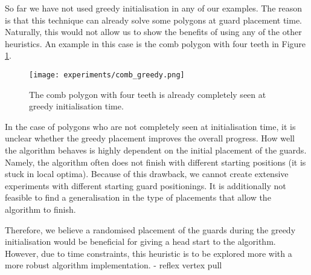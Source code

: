So far we have not used greedy initialisation in any of our examples. The reason is that this technique can already solve some polygons at guard placement time. Naturally, this would not allow us to show the benefits of using any of the other heuristics. An example in this case is the comb polygon with four teeth in Figure \ref{fig:comb_greedy}.

\begin{figure}[h!]
    \centering
    \texttt{[image: experiments/comb\_greedy.png]}
    \caption{The comb polygon with four teeth is already completely seen at greedy initialisation time.}
    \label{fig:comb_greedy}
\end{figure}

In the case of polygons who are not completely seen at initialisation time, it is unclear whether the greedy placement improves the overall progress. How well the algorithm behaves is highly dependent on the initial placement of the guards. Namely, the algorithm often does not finish with different starting positions (it is stuck in local optima). Because of this drawback, we cannot create extensive experiments with different starting guard positionings. It is additionally not feasible to find a generalisation in the type of placements that allow the algorithm to finish.

Therefore, we believe a randomised placement of the guards during the greedy initialisation would be beneficial for giving a head start to the algorithm. However, due to time constraints, this heuristic is to be explored more with a more robust algorithm implementation.
- reflex vertex pull
